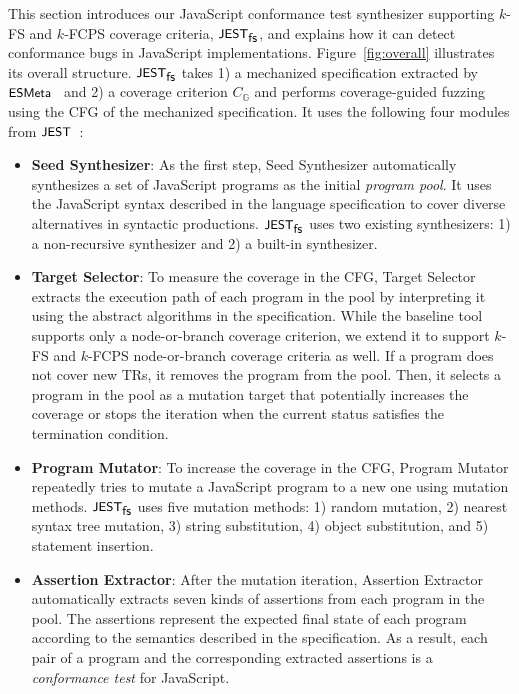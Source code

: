 \documentclass[acmsmall,review,screen]{acmart}
\newcommand{\name}[1]{\textsf{#1}}
\newcommand{\sname}[1]{\name{\small #1}}
\newcommand{\jest}{\sname{JEST}}
\newcommand{\esmeta}{\sname{ESMeta}}
\newcommand{\tool}{\jest_{\sname{fs}}}
\newcommand{\graph}{\mathbb{G}}
\newcommand{\cov}[1]{C_{#1}}
\begin{document}
This section introduces our JavaScript
conformance test synthesizer supporting $k$-FS and $k$-FCPS coverage criteria,
$\tool$, and explains how it can detect conformance bugs in JavaScript implementations.
Figure~\ref{fig:overall} illustrates its overall structure.
$\tool$ takes 1) a mechanized specification extracted by $\esmeta$~\cite{esmeta}
and 2) a coverage criterion $\cov{\graph}$ and performs
coverage-guided fuzzing~\cite{afl} using the CFG of the mechanized specification.
It uses the following four modules from $\jest$~\cite{jest}:
\begin{itemize}
  \item \textsf{\textbf{Seed Synthesizer}}:
    As the first step, \textsf{Seed Synthesizer} automatically synthesizes a set
    of JavaScript programs as the initial \textit{program pool}.
    It uses the JavaScript syntax described in the language specification to
    cover diverse alternatives in syntactic productions.
    $\tool$ uses two existing synthesizers: 1) a non-recursive synthesizer and
    2) a built-in synthesizer.
  \item \textsf{\textbf{Target Selector}}:
    To measure the coverage in the CFG, \textsf{Target Selector} extracts the
    execution path of each program in the pool by interpreting it using the
    abstract algorithms in the specification.
    While the baseline tool supports only a node-or-branch coverage criterion,
    we extend it to support $k$-FS and $k$-FCPS node-or-branch coverage
    criteria as well.
    If a program does not cover new TRs, it removes the program from the pool.
    Then, it selects a program in the pool as a mutation target that potentially
    increases the coverage or stops the iteration when the current status
    satisfies the termination condition.
  \item \textsf{\textbf{Program Mutator}}:
    To increase the coverage in the CFG, \textsf{Program Mutator} repeatedly
    tries to mutate a JavaScript program to a new one using mutation methods.
    $\tool$ uses five mutation methods: 1) random mutation, 2)
    nearest syntax tree mutation, 3) string substitution, 4) object
    substitution, and 5) statement insertion.
  \item \textsf{\textbf{Assertion Extractor}}:
    After the mutation iteration, \textsf{Assertion Extractor} automatically
    extracts seven kinds of assertions from each program in the pool.
    The assertions represent the expected final state of each program according
    to the semantics described in the specification.
    As a result, each pair of a program and the corresponding extracted
    assertions is a \textit{conformance test} for JavaScript.
\end{itemize}
\end{document}
